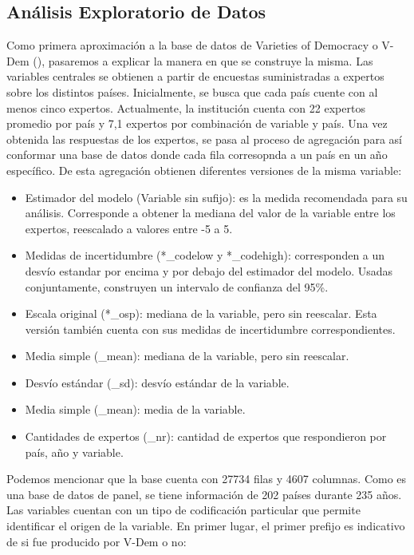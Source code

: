 \documentclass{article}
\begin{document}
\subsection{Análisis Exploratorio de Datos}
Como primera aproximación a la base de datos de Varieties of Democracy o V-Dem 
(\cite{CopMet24}), pasaremos a explicar la manera en que se construye la misma. Las
variables centrales se obtienen a partir de encuestas suministradas a expertos
sobre los distintos países. Inicialmente, se busca que cada país cuente con al menos
cinco expertos. Actualmente, la institución cuenta con 22 expertos promedio por país
y 7,1 expertos por combinación de variable y país. Una vez obtenida las respuestas
de los expertos, se pasa al proceso de agregación para así conformar una base de 
datos donde cada fila corresopnda a un país en un año específico. De esta agregación
obtienen diferentes versiones de la misma variable:

\begin{itemize}
  \item Estimador del modelo (Variable sin sufijo): es la medida
   recomendada para su análisis. Corresponde a obtener la mediana del valor de 
   la variable entre los expertos, reescalado a valores entre -5 a 5.
  \item Medidas de incertidumbre (*\_codelow y *\_codehigh): corresponden a un 
  desvío estandar por encima y por debajo del estimador del modelo. 
  Usadas conjuntamente, construyen un intervalo de confianza del 95\%.
  \item Escala original (*\_osp): mediana de la variable, pero sin reescalar. Esta
  versión también cuenta con sus medidas de incertidumbre correspondientes.
  \item Media simple (\_mean): mediana de la variable, pero sin reescalar.
  \item Desvío estándar (\_sd): desvío estándar de la variable.
  \item Media simple (\_mean): media de la variable.
  \item Cantidades de expertos (\_nr): cantidad de expertos que respondieron por
  país, año y variable.
\end{itemize}

Podemos mencionar que la base cuenta con 27734 filas y 4607 columnas. Como es una 
base de datos de panel, se tiene información de 202 países durante 235 años. Las 
variables cuentan con un tipo de codificación particular que permite identificar el 
origen de la  variable. En primer lugar, el primer prefijo es indicativo de si fue 
producido por V-Dem o no:
\end{document}
